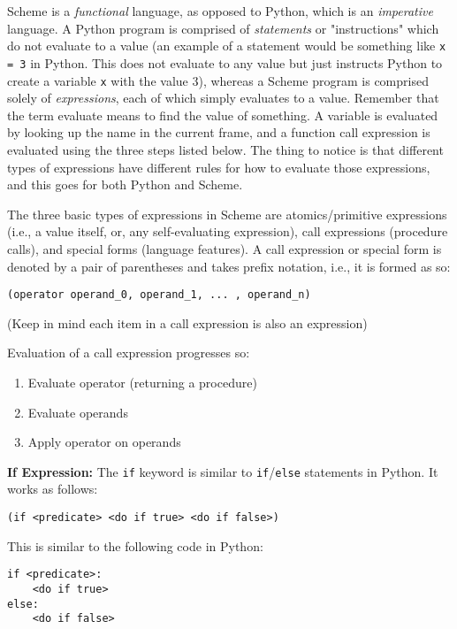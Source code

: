Scheme is a \textit{functional} language, as opposed to Python, which is an \textit{imperative} language. A Python program is comprised of \textit{statements} or "instructions" which do not evaluate to a value (an example of a statement would be something like \lstinline{x = 3} in Python. This does not evaluate to any value but just instructs Python to create a variable \lstinline{x} with the value 3), whereas a Scheme program is comprised solely of \textit{expressions}, each of which simply evaluates to a value. Remember that the term evaluate means to find the value of something. A variable is evaluated by looking up the name in the current frame, and a function call expression is evaluated using the three steps listed below. The thing to notice is that different types of expressions have different rules for how to evaluate those expressions, and this goes for both Python and Scheme. 

The three basic types of expressions in Scheme are atomics/primitive expressions (i.e., a value itself, or, any self-evaluating expression), call expressions (procedure calls), and special forms (language features).  A call expression or special form is denoted by a pair of parentheses and takes prefix notation, i.e., it is formed as so:
\vspace{0.5mm}
\begin{lstlisting}
(operator operand_0, operand_1, ... , operand_n)
\end{lstlisting}

(Keep in mind each item in a call expression is also an expression)

Evaluation of a call expression progresses so:
\begin{enumerate}
\item Evaluate operator (returning a procedure)
\item Evaluate operands
\item Apply operator on operands
\end{enumerate}

\newpage 

\textbf{If Expression: }
The \lstinline{if} keyword is similar to \lstinline{if}/\lstinline{else} statements in Python. It works as follows:
\begin{lstlisting}
(if <predicate> <do if true> <do if false>)
\end{lstlisting}

This is similar to the following code in Python:
\begin{lstlisting}
if <predicate>:
    <do if true>
else:
    <do if false>
\end{lstlisting}

